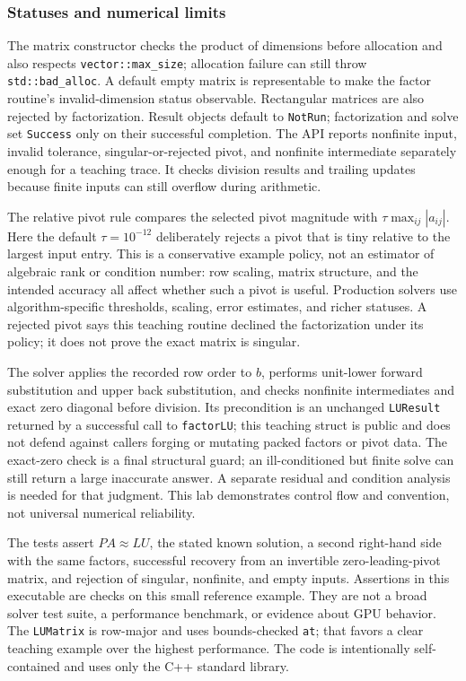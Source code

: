 \subsubsection{Statuses and numerical limits}\label{01-foundations-i-ch019-statuses-and-numerical-limits}

The matrix constructor checks the product of dimensions before allocation and also respects \texttt{vector::max\_size}; allocation failure can still throw \texttt{std::bad\_alloc}. A default empty matrix is representable to make the factor routine's invalid-dimension status observable. Rectangular matrices are also rejected by factorization. Result objects default to \texttt{NotRun}; factorization and solve set \texttt{Success} only on their successful completion. The API reports nonfinite input, invalid tolerance, singular-or-rejected pivot, and nonfinite intermediate separately enough for a teaching trace. It checks division results and trailing updates because finite inputs can still overflow during arithmetic.

The relative pivot rule compares the selected pivot magnitude with \(\tau\max_{ij}|a_{ij}|\). Here the default \(\tau=10^{-12}\) deliberately rejects a pivot that is tiny relative to the largest input entry. This is a conservative example policy, not an estimator of algebraic rank or condition number: row scaling, matrix structure, and the intended accuracy all affect whether such a pivot is useful. Production solvers use algorithm-specific thresholds, scaling, error estimates, and richer statuses. A rejected pivot says this teaching routine declined the factorization under its policy; it does not prove the exact matrix is singular.

The solver applies the recorded row order to \(b\), performs unit-lower forward substitution and upper back substitution, and checks nonfinite intermediates and exact zero diagonal before division. Its precondition is an unchanged \texttt{LUResult} returned by a successful call to \texttt{factorLU}; this teaching struct is public and does not defend against callers forging or mutating packed factors or pivot data. The exact-zero check is a final structural guard; an ill-conditioned but finite solve can still return a large inaccurate answer. A separate residual and condition analysis is needed for that judgment. This lab demonstrates control flow and convention, not universal numerical reliability.

The tests assert \(PA\approx LU\), the stated known solution, a second right-hand side with the same factors, successful recovery from an invertible zero-leading-pivot matrix, and rejection of singular, nonfinite, and empty inputs. Assertions in this executable are checks on this small reference example. They are not a broad solver test suite, a performance benchmark, or evidence about GPU behavior. The \texttt{LUMatrix} is row-major and uses bounds-checked \texttt{at}; that favors a clear teaching example over the highest performance. The code is intentionally self-contained and uses only the C++ standard library.

